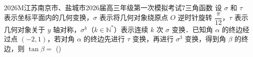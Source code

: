 
\begin{problem}{2026}{M}{江苏南京市、盐城市2026届高三年级第一次模拟考试}{7}{三角函数}
设 $\sigma$ 和 $\tau$ 表示坐标平面内的几何变换，$\sigma$ 表示将几何对象绕原点 $O$ 逆时针旋转 $\dfrac{\pi}{12}$，$\tau$ 表示几何对象关于 $y$ 轴对称，$\sigma^k$（$k\in\mathbb{N}^*$）表示连续 $k$ 次 $\sigma$ 变换．已知角 $\alpha$ 的终边经过点 $(-2,1)$，若对角 $\alpha$ 的终边先进行 $\tau$ 变换，再进行 $\sigma^3$ 变换，得到角 $\beta$ 的终边，则 $\tan\beta=$
(\hspace{1cm})
\begin{choices}
\end{choices}
\end{problem}